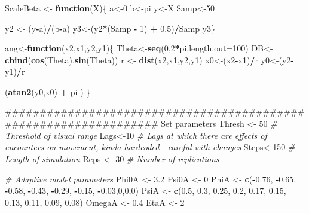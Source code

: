 \documentclass[]{article}
\newenvironment{Shaded}{\begin{snugshade}}{\end{snugshade}}
\newcommand{\KeywordTok}[1]{\textcolor[rgb]{0.13,0.29,0.53}{\textbf{#1}}}
\newcommand{\DataTypeTok}[1]{\textcolor[rgb]{0.13,0.29,0.53}{#1}}
\newcommand{\DecValTok}[1]{\textcolor[rgb]{0.00,0.00,0.81}{#1}}
\newcommand{\FloatTok}[1]{\textcolor[rgb]{0.00,0.00,0.81}{#1}}
\newcommand{\StringTok}[1]{\textcolor[rgb]{0.31,0.60,0.02}{#1}}
\newcommand{\CommentTok}[1]{\textcolor[rgb]{0.56,0.35,0.01}{\textit{#1}}}
\newcommand{\ControlFlowTok}[1]{\textcolor[rgb]{0.13,0.29,0.53}{\textbf{#1}}}
\newcommand{\OperatorTok}[1]{\textcolor[rgb]{0.81,0.36,0.00}{\textbf{#1}}}
\newcommand{\NormalTok}[1]{#1}
\begin{document}
\begin{Shaded}
\begin{Highlighting}[]
{\NormalTok{    ScaleBeta <-}\StringTok{ }\ControlFlowTok{function}\NormalTok{(X)\{}
\NormalTok{     a<-}\DecValTok{0}
\NormalTok{     b<-pi}
\NormalTok{     y<-X}
\NormalTok{     Samp<-}\DecValTok{50}
    
\NormalTok{     y2 <-}\StringTok{ }\NormalTok{(y}\OperatorTok{-}\NormalTok{a)}\OperatorTok{/}\NormalTok{(b}\OperatorTok{-}\NormalTok{a)}
\NormalTok{     y3<-(y2}\OperatorTok{*}\NormalTok{(Samp }\OperatorTok{-}\StringTok{ }\DecValTok{1}\NormalTok{) }\OperatorTok{+}\StringTok{ }\FloatTok{0.5}\NormalTok{)}\OperatorTok{/}\NormalTok{Samp}
\NormalTok{     y3\}}
    
\NormalTok{    ang<-}\ControlFlowTok{function}\NormalTok{(x2,x1,y2,y1)\{}
\NormalTok{      Theta<-}\KeywordTok{seq}\NormalTok{(}\DecValTok{0}\NormalTok{,}\DecValTok{2}\OperatorTok{*}\NormalTok{pi,}\DataTypeTok{length.out=}\DecValTok{100}\NormalTok{)}
\NormalTok{      DB<-}\KeywordTok{cbind}\NormalTok{(}\KeywordTok{cos}\NormalTok{(Theta),}\KeywordTok{sin}\NormalTok{(Theta))}
\NormalTok{       r <-}\StringTok{ }\KeywordTok{dist}\NormalTok{(x2,x1,y2,y1)}
\NormalTok{       x0<-(x2}\OperatorTok{-}\NormalTok{x1)}\OperatorTok{/}\NormalTok{r}
\NormalTok{       y0<-(y2}\OperatorTok{-}\NormalTok{y1)}\OperatorTok{/}\NormalTok{r}
    
\NormalTok{       (}\KeywordTok{atan2}\NormalTok{(y0,x0) }\OperatorTok{+}\StringTok{ }\NormalTok{pi )}
\NormalTok{       \}}
    
\NormalTok{    ################################################################# Set parameters}
\NormalTok{    Thresh <-}\StringTok{ }\DecValTok{50}         \CommentTok{# Threshold of visual range}
\NormalTok{    Lags<-}\DecValTok{10}             \CommentTok{# Lags at which there are effects of encounters on movement, kinda hardcoded---careful with changes}
\NormalTok{    Steps<-}\DecValTok{150}           \CommentTok{# Length of simulation}
\NormalTok{    Reps <-}\StringTok{ }\DecValTok{30}           \CommentTok{# Number of replications}
    
    \CommentTok{# Adaptive model parameters}
\NormalTok{    Phi0A <-}\StringTok{ }\FloatTok{3.2}
\NormalTok{    Psi0A <-}\StringTok{ }\DecValTok{0}
\NormalTok{    PhiA  <-}\StringTok{ }\KeywordTok{c}\NormalTok{(}\OperatorTok{-}\FloatTok{0.76}\NormalTok{, }\OperatorTok{-}\FloatTok{0.65}\NormalTok{, }\OperatorTok{-}\FloatTok{0.58}\NormalTok{, }\OperatorTok{-}\FloatTok{0.43}\NormalTok{, }\OperatorTok{-}\FloatTok{0.29}\NormalTok{, }\OperatorTok{-}\FloatTok{0.15}\NormalTok{, }\OperatorTok{-}\FloatTok{0.03}\NormalTok{,}\DecValTok{0}\NormalTok{,}\DecValTok{0}\NormalTok{,}\DecValTok{0}\NormalTok{)}
\NormalTok{    PsiA <-}\StringTok{ }\KeywordTok{c}\NormalTok{(}\FloatTok{0.5}\NormalTok{, }\FloatTok{0.3}\NormalTok{, }\FloatTok{0.25}\NormalTok{, }\FloatTok{0.2}\NormalTok{, }\FloatTok{0.17}\NormalTok{, }\FloatTok{0.15}\NormalTok{, }\FloatTok{0.13}\NormalTok{, }\FloatTok{0.11}\NormalTok{, }\FloatTok{0.09}\NormalTok{, }\FloatTok{0.08}\NormalTok{)}
\NormalTok{    OmegaA <-}\StringTok{ }\FloatTok{0.4}
\NormalTok{    EtaA <-}\StringTok{ }\DecValTok{2}
    
}
\end{Highlighting}
\end{Shaded}
\end{document}
